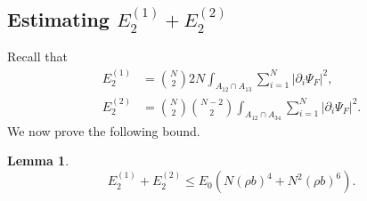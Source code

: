 \documentclass[a4paper,11pt]{article}
\newcommand{\abs}[1]{\left\lvert #1 \right\rvert}
\newtheorem{lemma}[theorem]{Lemma}
\numberwithin{equation}{section}
\begin{document}
		\subsection{Estimating $E_2^{(1)}+E_2^{(2)}$}
		\label{secE2}
		Recall that \begin{equation}
		\begin{aligned}
		E_2^{(1)}&=\binom{N}{2}2N\int_{A_{12}\cap A_{13}}\sum_{i=1}^{N}\abs{\partial_i\Psi_F}^2,\\ E_2^{(2)}&=\binom{N}{2}\binom{N-2}{2}\int_{A_{12}\cap A_{34}}\sum_{i=1}^{N}\abs{\partial_i\Psi_F}^2.
		\end{aligned}
		\end{equation}
		We now prove the following bound. 
		\begin{lemma}\label{LemmaE2Bound}
			\begin{equation}
			E_2^{(1)}+E_2^{(2)}\leq E_0\left(N(\rho b)^4+N^2(\rho b)^6\right).
			\end{equation}
		\end{lemma}
\end{document}
